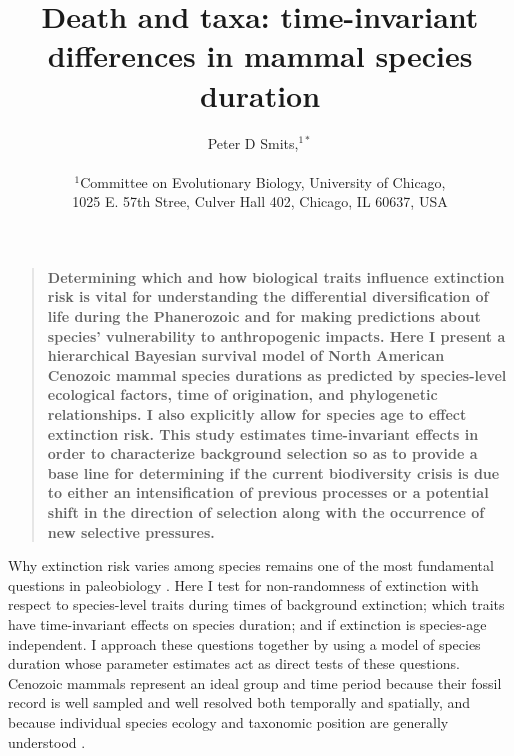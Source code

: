 \documentclass[12pt]{article}
\title{Death and taxa: time-invariant differences in mammal species duration}
\author
{Peter D Smits,$^{1\ast}$\\
\\
\normalsize{$^{1}$Committee on Evolutionary Biology, University of Chicago,}\\
\normalsize{1025 E. 57th Stree, Culver Hall 402, Chicago, IL 60637, USA}\\
}
\date{}
\newenvironment{sciabstract}{%
\begin{quote} \bf}
{\end{quote}}
\begin{document}
 


\baselineskip24pt


\maketitle 
\linenumbers
\modulolinenumbers[2]


\begin{sciabstract}
  Determining which and how biological traits influence extinction risk is vital for understanding the differential diversification of life during the Phanerozoic and for making predictions about species' vulnerability to anthropogenic impacts. Here I present a hierarchical Bayesian survival model of North American Cenozoic mammal species durations as predicted by species-level ecological factors, time of origination, and phylogenetic relationships. I also explicitly allow for species age to effect extinction risk. This study estimates time-invariant effects in order to characterize background selection so as to provide a base line for determining if the current biodiversity crisis is due to either an intensification of previous processes or a potential shift in the direction of selection along with the occurrence of new selective pressures.
\end{sciabstract}

Why extinction risk varies among species remains one of the most fundamental questions in paleobiology \cite{Simpson1944,VanValen1973,Raup1994,Quental2013,Wagner2014b}. Here I test for non-randomness of extinction with respect to species-level traits during times of background extinction; which traits have time-invariant effects on species duration; and if extinction is species-age independent. I approach these questions together by using a model of species duration whose parameter estimates act as direct tests of these questions. Cenozoic mammals represent an ideal group and time period because their fossil record is well sampled and well resolved both temporally and spatially, and because individual species ecology and taxonomic position are generally understood \cite{Alroy2009,Liow2008,Smith2004,Quental2013,Simpson1944,Tomiya2013,Marcot2014}. 
\end{document}

